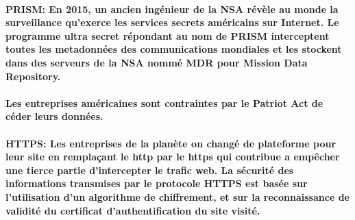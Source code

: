 \paragraph{
  PRISM: En 2015, un ancien ingénieur de la NSA révèle au monde la surveillance qu'exerce les services secrets américains sur Internet. Le programme ultra secret répondant au nom de PRISM interceptent toutes les metadonnées des communications mondiales et les stockent dans des serveurs de la NSA nommé MDR pour Mission Data Repository.
}

\paragraph{
  Les entreprises américaines sont contraintes par le Patriot Act de céder leurs données.
}

\paragraph{
  HTTPS: Les entreprises de la planète on changé de plateforme pour leur site en remplaçant le http par le https qui contribue a empêcher une tierce partie d'intercepter le trafic web. La sécurité des informations transmises par le protocole HTTPS est basée sur l'utilisation d'un algorithme de chiffrement, et sur la reconnaissance de validité du certificat d'authentification du site visité.
}
